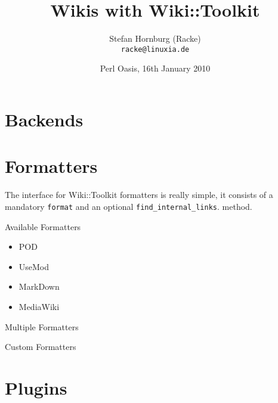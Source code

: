 \usepackage{beamerthemesplit}
\usepackage{verbatim}

\title{Wikis with Wiki::Toolkit}
\author[racke]{Stefan Hornburg (Racke)\\ \texttt{racke@linuxia.de}}
\date[OPW2010]{Perl Oasis, 16th January 2010}



\begin{frame}
  \titlepage
\end{frame}

\section[Outline]{}
\frame{\tableofcontents}

\section{Backends}

\section{Formatters}

The interface for Wiki::Toolkit formatters is really simple, it consists
of a mandatory \verb+format+ and an optional \verb+find_internal_links+.
method.

\begin{frame}{Available Formatters}
 \begin{itemize}
  \item<1-> POD
  \item<2-> UseMod
  \item<3-> MarkDown
  \item<4-> MediaWiki
  \end{itemize}
\end{frame}

\begin{frame}{Multiple Formatters}
\end{frame}

\begin{frame}{Custom Formatters}
\end{frame}

\section{Plugins}


    
